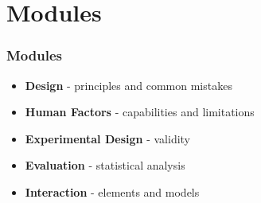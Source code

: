 \documentclass{beamer}
\begin{document}
\section{Modules} %

\begin{frame}
\frametitle{Modules}
\begin{itemize}
	\item \textbf{Design} - principles and common mistakes
	\item \textbf{Human Factors} - capabilities and limitations
	\item \textbf{Experimental Design} - validity
	\item \textbf{Evaluation} - statistical analysis
	\item \textbf{Interaction} - elements and models
\end{itemize}
\end{frame}

%
\end{document}
